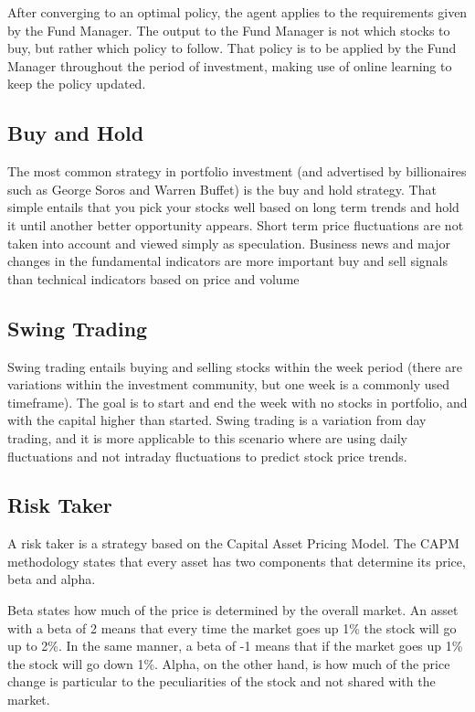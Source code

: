 \documentclass[prodmode,acmtecs]{acmsmall} %
\begin{document}
After converging to an optimal policy, the agent applies to the requirements given by the Fund Manager. The output to the Fund Manager is not which stocks to buy, but rather which policy to follow. That policy is to be applied by the Fund Manager throughout the period of investment, making use of online learning to keep the policy updated. 

\subsection {Buy and Hold}

The most common strategy in portfolio investment (and advertised by billionaires such as George Soros and Warren Buffet) is the buy and hold strategy. That simple entails that you pick your stocks well based on long term trends and hold it until another better opportunity appears. Short term price fluctuations are not taken into account and viewed simply as speculation. Business news and major changes in the fundamental indicators are more important buy and sell signals than technical indicators based on price and volume

\subsection {Swing Trading}

Swing trading entails buying and selling stocks within the week period (there are variations within the investment community, but one week is a commonly used timeframe). The goal is to start and end the week with no stocks in portfolio, and with the capital higher than started. Swing trading is a variation from day trading, and it is more applicable to this scenario where are using daily fluctuations and not intraday fluctuations to predict stock price trends.

\subsection {Risk Taker}

A risk taker is a strategy based on the Capital Asset Pricing Model. The CAPM methodology states that every asset has two components that determine its price, beta and alpha. 

Beta states how much of the price is determined by the overall market. An asset with a beta of 2 means that every time the market goes up 1\% the stock will go up to 2\%. In the same manner, a beta of -1 means that if the market goes up 1\% the stock will go down 1\%. Alpha, on the other hand, is how much of the price change is particular to the peculiarities of the stock and not shared with the market. 
\end{document}
